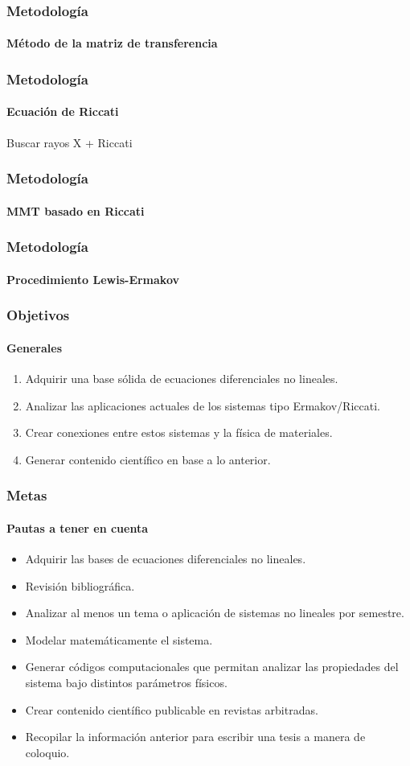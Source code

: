 \documentclass{beamer}
\begin{document}
\begin{frame}
\frametitle{Metodología}
\framesubtitle{Método de la matriz de transferencia}

\end{frame}

\begin{frame}
\frametitle{Metodología}
\framesubtitle{Ecuación de Riccati}

Buscar rayos X + Riccati

\end{frame}

\begin{frame}
\frametitle{Metodología}
\framesubtitle{MMT basado en Riccati}

\end{frame}

\begin{frame}
\frametitle{Metodología}
\framesubtitle{Procedimiento Lewis-Ermakov}

\end{frame}

\begin{frame}
\frametitle{Objetivos}
\framesubtitle{Generales}
\begin{enumerate}
 \item Adquirir una base sólida de ecuaciones diferenciales no lineales.
 \item Analizar las aplicaciones actuales de los sistemas tipo Ermakov/Riccati.
 \item Crear conexiones entre estos sistemas y la física de materiales.
 \item Generar contenido científico en base a lo anterior.
\end{enumerate}
\end{frame}

\begin{frame}
\frametitle{Metas}
\framesubtitle{Pautas a tener en cuenta}
\begin{itemize}
 \item Adquirir las bases de ecuaciones diferenciales no lineales.
 \item Revisión bibliográfica.
 \item Analizar al menos un tema o aplicación de sistemas no lineales por semestre.
 \item Modelar matemáticamente el sistema.
 \item Generar códigos computacionales que permitan analizar las propiedades del sistema bajo
 distintos parámetros físicos.
 \item Crear contenido científico publicable en revistas arbitradas.
 \item Recopilar la información anterior para escribir una tesis a manera de coloquio.
\end{itemize}
\end{frame}
\end{document}
